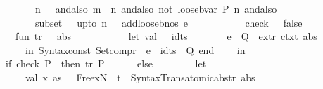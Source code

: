 \begin{isabellebody}
\ \ \ \ \ \ \ \ \ \ \ \ n\ {\isachargreater}{\kern0pt}\ {}\ andalso\ m\ {\isacharequal}{\kern0pt}\ n\ andalso\ not\ {\isacharparenleft}{\kern0pt}loose{\isacharunderscore}{\kern0pt}bvar{}\ {\isacharparenleft}{\kern0pt}P{\isacharcomma}{\kern0pt}\ n{\isacharparenright}{\kern0pt}{\isacharparenright}{\kern0pt}\ andalso\isanewline
\ \ \ \ \ \ \ \ \ \ \ \ subset\ {\isacharparenleft}{\kern0pt}{\isacharequal}{\kern0pt}{\isacharparenright}{\kern0pt}\ {\isacharparenleft}{\kern0pt}{}\ upto\ {\isacharparenleft}{\kern0pt}n\ {\isacharminus}{\kern0pt}\ {}{\isacharparenright}{\kern0pt}{\isacharcomma}{\kern0pt}\ add{\isacharunderscore}{\kern0pt}loose{\isacharunderscore}{\kern0pt}bnos\ {\isacharparenleft}{\kern0pt}e{\isacharcomma}{\kern0pt}\ {}{\isacharcomma}{\kern0pt}\ {\isacharbrackleft}{\kern0pt}{\isacharbrackright}{\kern0pt}{\isacharparenright}{\kern0pt}{\isacharparenright}{\kern0pt}\isanewline
\ \ \ \ \ \ \ \ {\isacharbar}{\kern0pt}\ check\ {\isacharunderscore}{\kern0pt}\ {\isacharequal}{\kern0pt}\ false{\isacharsemicolon}{\kern0pt}\isanewline
\isanewline
\ \ \ \ \ \ \ \ fun\ tr{\isacharprime}{\kern0pt}\ {\isacharparenleft}{\kern0pt}{\isacharunderscore}{\kern0pt}\ {\isachardollar}{\kern0pt}\ abs{\isacharparenright}{\kern0pt}\ {\isacharequal}{\kern0pt}\isanewline
\ \ \ \ \ \ \ \ \ \ let\ val\ {\isacharunderscore}{\kern0pt}\ {\isachardollar}{\kern0pt}\ idts\ {\isachardollar}{\kern0pt}\ {\isacharparenleft}{\kern0pt}{\isacharunderscore}{\kern0pt}\ {\isachardollar}{\kern0pt}\ {\isacharparenleft}{\kern0pt}{\isacharunderscore}{\kern0pt}\ {\isachardollar}{\kern0pt}\ {\isacharunderscore}{\kern0pt}\ {\isachardollar}{\kern0pt}\ e{\isacharparenright}{\kern0pt}\ {\isachardollar}{\kern0pt}\ Q{\isacharparenright}{\kern0pt}\ {\isacharequal}{\kern0pt}\ ex{\isacharunderscore}{\kern0pt}tr{\isacharprime}{\kern0pt}\ ctxt\ {\isacharbrackleft}{\kern0pt}abs{\isacharbrackright}{\kern0pt}\isanewline
\ \ \ \ \ \ \ \ \ \ in\ Syntax{\isachardot}{\kern0pt}const\ \isactrlsyntaxUNDERSCOREconst {\isasymopen}{\isacharunderscore}{\kern0pt}Setcompr{\isasymclose}\ {\isachardollar}{\kern0pt}\ e\ {\isachardollar}{\kern0pt}\ idts\ {\isachardollar}{\kern0pt}\ Q\ end{\isacharsemicolon}{\kern0pt}\isanewline
\ \ \ \ in\isanewline
\ \ \ \ \ \ if\ check\ {\isacharparenleft}{\kern0pt}P{\isacharcomma}{\kern0pt}\ {}{\isacharparenright}{\kern0pt}\ then\ tr{\isacharprime}{\kern0pt}\ P\isanewline
\ \ \ \ \ \ else\isanewline
\ \ \ \ \ \ \ \ let\isanewline
\ \ \ \ \ \ \ \ \ \ val\ {\isacharparenleft}{\kern0pt}x\ as\ {\isacharunderscore}{\kern0pt}\ {\isachardollar}{\kern0pt}\ Free{\isacharparenleft}{\kern0pt}xN{\isacharcomma}{\kern0pt}\ {\isacharunderscore}{\kern0pt}{\isacharparenright}{\kern0pt}{\isacharcomma}{\kern0pt}\ t{\isacharparenright}{\kern0pt}\ {\isacharequal}{\kern0pt}\ Syntax{\isacharunderscore}{\kern0pt}Trans{\isachardot}{\kern0pt}atomic{\isacharunderscore}{\kern0pt}abs{\isacharunderscore}{\kern0pt}tr{\isacharprime}{\kern0pt}\ abs{\isacharsemicolon}{\kern0pt}\isanewline

\end{isabellebody}
